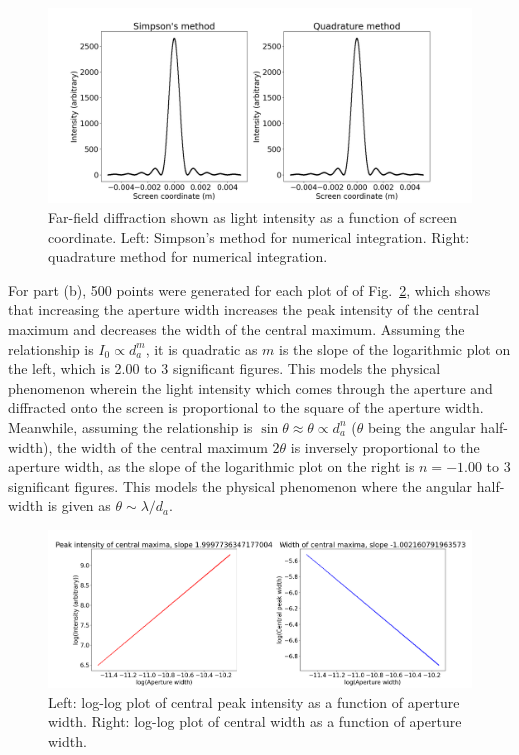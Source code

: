 \documentclass[hyphens,twocolumn,nobalancelastpage,aps,10pt,citeautoscript,longbibliography]{revtex4-2}
\begin{document}
\begin{figure}[htpb] \centering
	\includegraphics[width=1\linewidth]{./assets/diffraction_1d/simps_quad_ff.png}
	\caption{Far-field diffraction shown as light intensity as a function of screen coordinate. Left: Simpson's method for numerical integration. Right: quadrature method for numerical integration.}%
	\label{fig:simps_quad_ff.png}
\end{figure}

For part (b), 500 points were generated for each plot of of
Fig.~\ref{fig:aperture_width_effects}, which shows that increasing the aperture
width increases the peak intensity of the central maximum and decreases the
width of the central maximum. Assuming the relationship is $I_0 \propto d_a^m$,
it is quadratic as $m$ is the slope of the logarithmic plot on the left, which
is 2.00 to 3 significant figures. This models the physical phenomenon wherein
the light intensity which comes through the aperture and diffracted onto the
screen is proportional to the square of the aperture width. Meanwhile, assuming
the relationship is $\sin{\theta} \approx \theta \propto d_a^n$ ($\theta$ being
the angular half-width), the width of the central maximum $2\theta$ is inversely
proportional to the aperture width, as the slope of the logarithmic plot on the
right is $n = -1.00$ to 3 significant figures. This models the physical
phenomenon where the angular half-width is given as $\theta \sim \lambda /
	d_a$.

\begin{figure}[htpb] \centering
	\includegraphics[width=1\linewidth]{./assets/diffraction_1d/aperture_width_effects_log.png}
	\caption{Left: log-log plot of central peak intensity as a function of aperture width. Right: log-log plot of central width as a function of aperture width.}%
	\label{fig:aperture_width_effects}
\end{figure}
\end{document}
